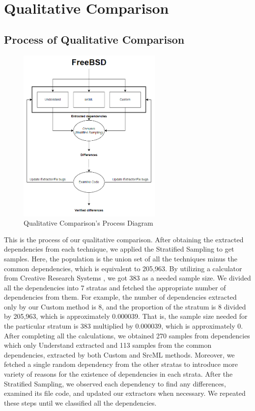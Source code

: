 \documentclass[12pt, dvipsnames, a4paper]{article}
\begin{document}
\section{Qualitative Comparison}
\subsection{Process of Qualitative Comparison}
\begin{figure}[h]
	\center
	\includegraphics[width=200pt]{assets/qualitative_process_diagram.PNG}
	\caption{Qualitative Comparison's Process Diagram}
\end{figure}
This is the process of our qualitative comparison. After obtaining the extracted dependencies from each technique, we applied the Stratified Sampling to get samples. Here, the population is the union set of all the techniques minus the common dependencies, which is equivalent to 205,963.
By utilizing a calculator from Creative Research Systems \cite{calculator}, we got 383 as a needed sample size. We divided all the dependencies into 7 stratas and fetched the appropriate number of dependencies from them.
For example, the number of dependencies extracted only by our Custom method is 8, and the proportion of the stratum is 8 divided by 205,963, which is approximately 0.000039.
That is, the sample size needed for the particular stratum is 383 multiplied by 0.000039, which is approximately 0.
After completing all the calculations, we obtained 270 samples from dependencies which only Understand extracted and 113 samples from the common dependencies, extracted by both Custom and SrcML methods.
Moreover, we fetched a single random dependency from the other stratas to introduce more variety of reasons for the existence of dependencies in each strata.
After the Stratified Sampling, we observed each dependency to find any differences, examined its file code, and updated our extractors when necessary. We repeated these steps until we classified all the dependencies.
\end{document}

